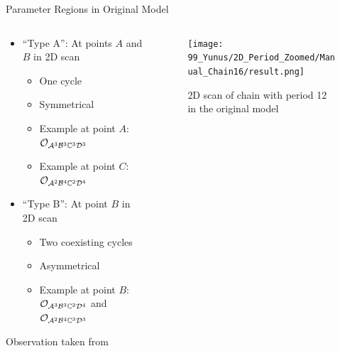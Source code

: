 \begin{frame}{Parameter Regions in Original Model}
    \begin{columns}
        \begin{column}{0.7 \textwidth}
            \begin{itemize}
                \item ``Type A'': At points $A$ and $B$ in 2D scan
                      \begin{itemize}
                          \item One cycle
                          \item Symmetrical
                          \item Example at point $A$: $\mathcal{O}_{\mathcal{A}^3\mathcal{B}^3\mathbb{C}^3\mathcal{D}^3}$
                          \item Example at point $C$: $\mathcal{O}_{\mathcal{A}^2\mathcal{B}^4\mathbb{C}^2\mathcal{D}^4}$ \vspace*{1em}
                      \end{itemize}
                \item ``Type B'': At point $B$ in 2D scan
                      \begin{itemize}
                          \item Two coexisting cycles
                          \item Asymmetrical
                          \item Example at point $B$: $\mathcal{O}_{\mathcal{A}^3\mathcal{B}^3\mathbb{C}^2\mathcal{D}^4}$ and $\mathcal{O}_{\mathcal{A}^2\mathcal{B}^4\mathbb{C}^3\mathcal{D}^3}$
                      \end{itemize}
            \end{itemize}

            \begin{flushright}
                Observation taken from \cite{akyuz2022}
            \end{flushright}
        \end{column}
        \begin{column}{0.3 \textwidth}
            \begin{center}
                \begin{figure}
                    \centering
                    \texttt{[image: 99\_Yunus/2D\_Period\_Zoomed/Manual\_Chain16/result.png]}
                    \caption{2D scan of chain with period 12 in the original model}
                \end{figure}
            \end{center}
        \end{column}
    \end{columns}
\end{frame}


